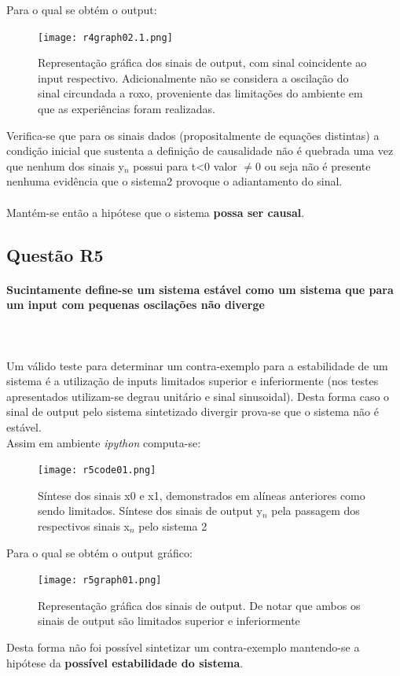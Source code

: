 \documentclass[a4paper,12pt]{article}
\begin{document}
			Para o qual se obtém o output:
			\begin{figure}[H]
                        	\centering
                          	\captionsetup{justification=centering}
                          	\texttt{[image: r4graph02.1.png]}
                          	\caption{Representação gráfica dos sinais de output, com sinal coincidente ao input respectivo. Adicionalmente não se considera a oscilação do sinal circundada a roxo, proveniente das limitações do ambiente em que as experiências foram realizadas.}
                  	\end{figure}
			Verifica-se que para os sinais dados (propositalmente de equações distintas) a condição inicial que sustenta a definição de causalidade não é quebrada uma vez que nenhum dos sinais y$_n$ possui para t<0 valor $\neq 0$ ou seja não é presente nenhuma evidência que o sistema2 provoque o adiantamento do sinal.\\ \mbox{} \\
		Mantém-se então a hipótese que o sistema \textbf{possa ser causal}.
		\newpage
		\subsection{Questão R5}
			\paragraph{Sucintamente define-se um sistema estável como um sistema que para um input com pequenas oscilações não diverge}\mbox{}\\\mbox{}\\
			Um válido teste para determinar um contra-exemplo para a estabilidade de um sistema é a utilização de inputs limitados superior e inferiormente (nos testes apresentados utilizam-se degrau unitário e sinal sinusoidal). Desta forma caso o sinal de output pelo sistema sintetizado divergir prova-se que o sistema não é estável.\\
			Assim em ambiente \textit{ipython} computa-se:
                  	\begin{figure}[H]
                        	\centering
                        	\captionsetup{justification=centering}
                        	\texttt{[image: r5code01.png]}
                		\caption{Síntese dos sinais x0 e x1, demonstrados em alíneas anteriores como sendo limitados. Síntese dos sinais de output y$_n$ pela passagem dos respectivos sinais x$_n$ pelo sistema 2}
                  		\end{figure}
                	Para o qual se obtém o output gráfico:
                  	\begin{figure}[H]
                        	\centering
                        	\captionsetup{justification=centering}
                		\texttt{[image: r5graph01.png]}
                		\caption{Representação gráfica dos sinais de output. De notar que ambos os sinais de output são limitados superior e inferiormente}
			\end{figure}
			Desta forma não foi possível sintetizar um contra-exemplo mantendo-se a hipótese da \textbf{possível estabilidade do sistema}.
\end{document}

